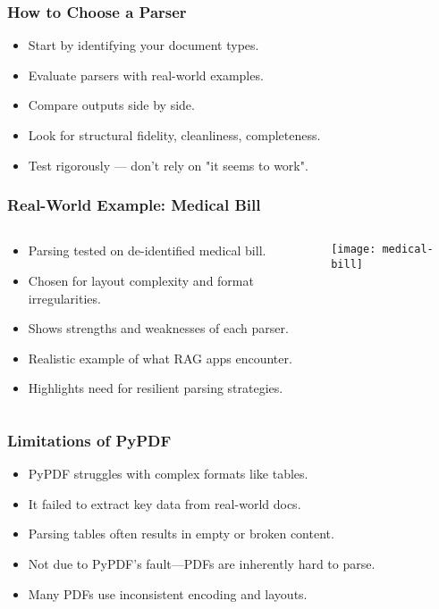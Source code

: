 \begin{frame}[fragile]\frametitle{How to Choose a Parser}
  \begin{itemize}
    \item Start by identifying your document types.
    \item Evaluate parsers with real-world examples.
    \item Compare outputs side by side.
    \item Look for structural fidelity, cleanliness, completeness.
    \item Test rigorously — don’t rely on "it seems to work".
  \end{itemize}
\end{frame}

\begin{frame}[fragile]\frametitle{Real-World Example: Medical Bill}
\begin{columns}
  \begin{column}[T]{0.6\linewidth}
    \begin{itemize}
      \item Parsing tested on de-identified medical bill.
      \item Chosen for layout complexity and format irregularities.
      \item Shows strengths and weaknesses of each parser.
      \item Realistic example of what RAG apps encounter.
      \item Highlights need for resilient parsing strategies.
    \end{itemize}
  \end{column}
  \begin{column}[T]{0.4\linewidth}
    \begin{center}
      \texttt{[image: medical-bill]}
    \end{center}
  \end{column}
\end{columns}
\end{frame}

\begin{frame}[fragile]\frametitle{Limitations of PyPDF}
  \begin{itemize}
    \item PyPDF struggles with complex formats like tables.
    \item It failed to extract key data from real-world docs.
    \item Parsing tables often results in empty or broken content.
    \item Not due to PyPDF's fault—PDFs are inherently hard to parse.
    \item Many PDFs use inconsistent encoding and layouts.
  \end{itemize}
\end{frame}

